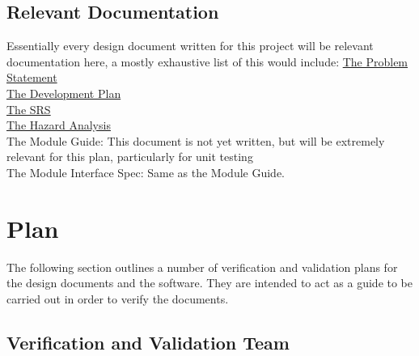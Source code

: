 \documentclass[12pt, titlepage]{article}
\begin{document}
\subsection{Relevant Documentation}

Essentially every design document written for this project will be relevant documentation here, a mostly exhaustive list of this would include:
\href{https://github.com/agentvv/MTOBridge/blob/main/docs/ProblemStatementAndGoals/ProblemStatement.pdf}{The Problem Statement}\\
\href{https://github.com/agentvv/MTOBridge/blob/main/docs/DevelopmentPlan/DevelopmentPlan.pdf}{The Development Plan}\\
\href{https://github.com/agentvv/MTOBridge/blob/main/docs/SRS/SRS.pdf}{The SRS}\\
\href{https://github.com/agentvv/MTOBridge/blob/main/docs/HazardAnalysis/HazardAnalysis.pdf}{The Hazard Analysis}\\
The Module Guide: This document is not yet written, but will be extremely relevant for this plan, particularly for unit testing\\
The Module Interface Spec: Same as the Module Guide.\\

\section{Plan}

The following section outlines a number of verification and validation plans for the design documents and the software. They are intended to act as a guide to be
carried out in order to verify the documents.
\\
\pagebreak
\subsection{Verification and Validation Team}
\end{document}
